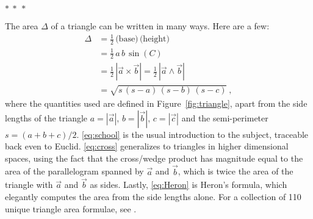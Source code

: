 \documentclass[12pt]{article}
\newcommand{\pseudosection}[1]
{}
\begin{document}
\bigskip
{\centering $\ast~\ast~\ast$ \par}
\bigskip

\pseudosection{Areas}
\noindent
The area $\Delta$ of a triangle can be written in many ways.
Here are a few:
\begin{align}
\Delta 
&= \frac{1}{2} \, \text{(base)} \, \text{(height)} \label{eq:school} \\
&= \frac{1}{2}\,a\,b\,\sin(C) \label{eq:sine} \\
&= \frac{1}{2}\, \left| \vec{a} \times \vec{b} \right|
    = \frac{1}{2}\, \left| \vec{a} \wedge \vec{b} \right| \label{eq:cross} \\
&= \sqrt{s\,(s-a)\,(s-b)\,(s-c)} \label{eq:Heron} ~,
\end{align}
where the quantities used are defined in Figure~\ref{fig:triangle}, apart from the side lengths of the triangle
$a = | \vec{a} |$, $b = | \vec{b} |$, $c = | \vec{c} |$
and the semi-perimeter $s = (a + b + c)/2$.
\eqref{eq:school} is the usual introduction to the subject, traceable back even to Euclid.
\eqref{eq:cross} generalizes to triangles in higher dimensional spaces, using the fact that the cross/wedge product has magnitude equal to the area of the parallelogram spanned by $\vec{a}$ and $\vec{b}$, which is twice the area of the triangle with $\vec{a}$ and $\vec{b}$ as sides.
Lastly, \eqref{eq:Heron} is Heron's formula, which elegantly computes the area from the side lengths alone.
For a collection of 110 unique triangle area formulae, see \citet{baker1885a,baker1885b}.
\end{document}
